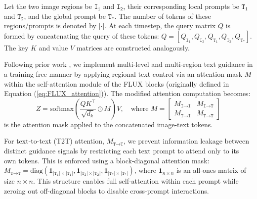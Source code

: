 \documentclass{article}
\newcommand{\kc}[1]{\textcolor{blue}{#1}}
\begin{document}

Let the two image regions be $\texttt{I}_\texttt{1}$ and $\texttt{I}_\texttt{2}$, their corresponding local prompts be $\texttt{T}_\texttt{1}$ and $\texttt{T}_\texttt{2}$, and the global prompt be $\texttt{T}_\texttt{*}$. The number of tokens of these regions/prompts is denoted by $|\cdot|$. At each timestep, the query matrix $Q$ is formed by concatenating the query of these tokens: $ Q= [Q_{\texttt{I}_\texttt{1}}, Q_{\texttt{I}_\texttt{2}}, Q_{\texttt{T}_\texttt{1}}, Q_{\texttt{T}_\texttt{2}}, Q_{\texttt{T}_\texttt{*}}]$. The key $K$ and value $V$ matrices are constructed analogously.

Following prior work \citep{chen2024training}, we implement multi-level and multi-region text guidance in a training-free manner by applying regional text control via an attention mask $M$ within the self-attention module of the FLUX blocks (originally defined in Equation (\ref{eq:FLUX_attention})). The modified attention computation becomes:
\begin{equation}
Z = \mathrm{softmax}\left(\frac{QK^\top}{\sqrt{d_k}} \odot M\right)V, \quad\text{where }M = \begin{bmatrix}
        M_{\texttt{I}\to\texttt{I}} &  M_{\texttt{I}\to\texttt{T}} \\
        M_{\texttt{T}\to\texttt{I}} &  M_{\texttt{T}\to\texttt{T}}
    \end{bmatrix}
\label{eq:masked_attention}
\end{equation}
is the attention mask applied to the concatenated image-text tokens.
    
For text-to-text (T2T) attention, $M_{\texttt{T}\to\texttt{T}}$, we prevent information leakage between distinct guidance signals by restricting each text prompt to attend only to its own tokens. This is enforced using a block-diagonal attention mask: $M_{\texttt{T}\to\texttt{T}}=\mathrm{diag}(\mathbf{1}_{|\texttt{T}_\texttt{1}| \times |\texttt{T}_\texttt{1}|}, \mathbf{1}_{|\texttt{T}_\texttt{2}| \times |\texttt{T}_\texttt{2}|},\mathbf{1}_{|\texttt{T}_\texttt{*}| \times|\texttt{T}_\texttt{*}|})$, where $\mathbf{1}_{n \times n}$ is an all-ones matrix of size $n \times n$. This structure enables full self-attention within each prompt while zeroing out off-diagonal blocks to disable cross-prompt interactions.
\end{document}
